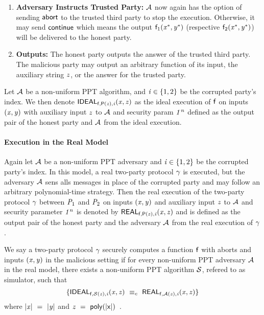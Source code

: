 \begin{enumerate}
    \item \textbf{Adversary Instructs Trusted Party:} $\mathcal{A}$ now again has the option of sending $\mathsf{abort}$ to the trusted third party to stop the execution.
    Otherwise, it may send $\mathsf{continue}$ which means the output $\mathsf{f}_1(\mathit{x}^*, \mathit{y}^*)$ (respective $\mathsf{f}_2(\mathit{x}^*, \mathit{y}^*)$) will be delivered to the honest party.
    \item \textbf{Outputs:} The honest party outputs the answer of the trusted third party. The malicious party may output an arbitrary function of its input, the auxiliary string $\mathit{z}$, or the answer for the trusted party.
\end{enumerate}

Let $\mathcal{A}$ be a non-uniform PPT algorithm, and $\mathit{i} \in \{1,2\}$ be the corrupted party's index.
We then denote $\mathsf{IDEAL}_{\mathsf{f}, \mathsf{P}(\mathit{z}), \mathit{i}}(\mathit{x}, \mathit{z})$ as the ideal execution of $\mathsf{f}$ on inputs $(\mathit{x}, \mathit{y})$ with auxiliary input $\mathit{z}$ to $\mathcal{A}$ and security param $\mathit{1^n}$ defined as the output pair of the honest party and $\mathcal{A}$ from the ideal execution.

\paragraph{Execution in the Real Model} Again let $\mathcal{A}$ be a non-uniform PPT adversary and $\mathit{i} \in \{1,2\}$ be the corrupted party's index.
In this model, a real two-party protocol $\gamma$ is executed, but the adversary $\mathcal{A}$ sens alls messages in place of the corrupted party and may follow an arbitrary polynomial-time strategy.
Then the real execution of the two-party protocol $\gamma$ between $\mathit{P}_{1}$ and $\mathit{P}_{2}$ on inputs $(\mathit{x}, \mathit{y})$ and auxiliary input $\mathit{z}$ to $\mathcal{A}$ and security parameter $\mathit{1^n}$ is denoted by $\mathsf{REAL}_{\mathsf{f}, \mathsf{P}(\mathit{z}), \mathit{i}}(\mathit{x}, \mathit{z})$ and is defined as the output pair of the honest party and the adversary $\mathcal{A}$ from the real execution of $\gamma$.

\begin{definition}\label{subsec:pre:security}
    We say a two-party protocol $\gamma$ securely computes a function $\mathsf{f}$ with aborts and inputs $(\mathit{x}, \mathit{y})$ in the malicious setting if for every non-uniform PPT adversary $\mathcal{A}$ in the real model, there exists a non-uniform PPT algorithm $\mathcal{S}$, refered to as simulator, such that
    \[
        \{ \mathsf{IDEAL}_{\mathsf{f}, \mathcal{S}(\mathit{z}), \mathit{i}}(\mathit{x}, \mathit{z}) ~\equiv_{c}~ \mathsf{REAL}_{\mathsf{f}, \mathcal{A}(\mathit{z}), \mathit{i}}(\mathit{x}, \mathit{z}) \}
    \]
    where $|\mathit{x}| ~=~ |\mathit{y}|$ and $\mathit{z} ~=~ \mathsf{poly(|x|)}$~\cite{lindell2017simulate}.
\end{definition}